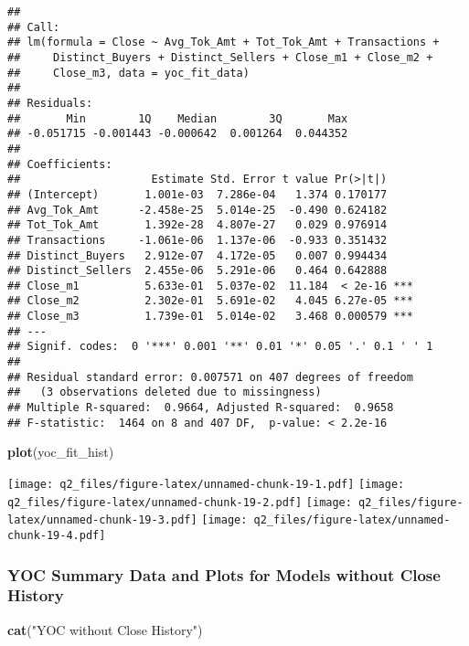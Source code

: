 \documentclass[]{article}
\newenvironment{Shaded}{\begin{snugshade}}{\end{snugshade}}
\newcommand{\KeywordTok}[1]{\textcolor[rgb]{0.13,0.29,0.53}{\textbf{#1}}}
\newcommand{\StringTok}[1]{\textcolor[rgb]{0.31,0.60,0.02}{#1}}
\newcommand{\NormalTok}[1]{#1}
\begin{document}
\begin{verbatim}
## 
## Call:
## lm(formula = Close ~ Avg_Tok_Amt + Tot_Tok_Amt + Transactions + 
##     Distinct_Buyers + Distinct_Sellers + Close_m1 + Close_m2 + 
##     Close_m3, data = yoc_fit_data)
## 
## Residuals:
##       Min        1Q    Median        3Q       Max 
## -0.051715 -0.001443 -0.000642  0.001264  0.044352 
## 
## Coefficients:
##                    Estimate Std. Error t value Pr(>|t|)    
## (Intercept)       1.001e-03  7.286e-04   1.374 0.170177    
## Avg_Tok_Amt      -2.458e-25  5.014e-25  -0.490 0.624182    
## Tot_Tok_Amt       1.392e-28  4.807e-27   0.029 0.976914    
## Transactions     -1.061e-06  1.137e-06  -0.933 0.351432    
## Distinct_Buyers   2.912e-07  4.172e-05   0.007 0.994434    
## Distinct_Sellers  2.455e-06  5.291e-06   0.464 0.642888    
## Close_m1          5.633e-01  5.037e-02  11.184  < 2e-16 ***
## Close_m2          2.302e-01  5.691e-02   4.045 6.27e-05 ***
## Close_m3          1.739e-01  5.014e-02   3.468 0.000579 ***
## ---
## Signif. codes:  0 '***' 0.001 '**' 0.01 '*' 0.05 '.' 0.1 ' ' 1
## 
## Residual standard error: 0.007571 on 407 degrees of freedom
##   (3 observations deleted due to missingness)
## Multiple R-squared:  0.9664, Adjusted R-squared:  0.9658 
## F-statistic:  1464 on 8 and 407 DF,  p-value: < 2.2e-16
\end{verbatim}

\begin{Shaded}
\begin{Highlighting}[]
\KeywordTok{plot}\NormalTok{(yoc_fit_hist)}
\end{Highlighting}
\end{Shaded}

\texttt{[image: q2\_files/figure-latex/unnamed-chunk-19-1.pdf]}
\texttt{[image: q2\_files/figure-latex/unnamed-chunk-19-2.pdf]}
\texttt{[image: q2\_files/figure-latex/unnamed-chunk-19-3.pdf]}
\texttt{[image: q2\_files/figure-latex/unnamed-chunk-19-4.pdf]}

\subsubsection{YOC Summary Data and Plots for Models without Close
History}\label{yoc-summary-data-and-plots-for-models-without-close-history}

\begin{Shaded}
\begin{Highlighting}[]
\KeywordTok{cat}\NormalTok{(}\StringTok{"YOC without Close History"}\NormalTok{)}
\end{Highlighting}
\end{Shaded}
\end{document}
